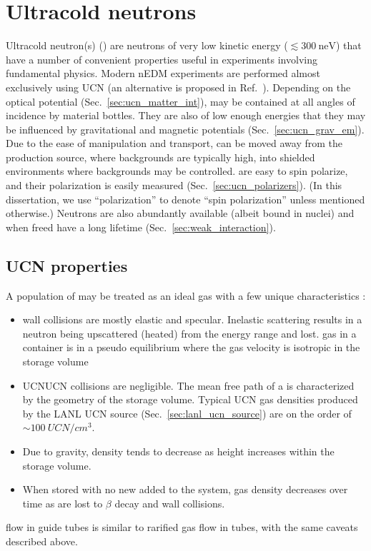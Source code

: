 
\chapter{Ultracold neutrons}\label{chap:UCN}


Ultracold neutron(s) (\ucn) are neutrons of very low kinetic energy ($\lesssim \qty{300}{\nano\eV}$) that have a number of convenient properties useful in experiments involving fundamental physics. Modern nEDM experiments are performed almost exclusively using UCN \cite{BAK06, SER15, ABE20} (an alternative is proposed in Ref.~\cite{PIE13}). Depending on the optical potential (Sec.~\ref{sec:ucn_matter_int}), \ucn may be contained at all angles of incidence by material bottles. They are also of low enough energies that they may be influenced by gravitational and magnetic potentials (Sec.~\ref{sec:ucn_grav_em}). Due to the ease of manipulation and transport, \ucn can be moved away from the production source, where backgrounds are typically high, into shielded environments where backgrounds may be controlled. \ucn are easy to spin polarize, and their polarization is easily measured (Sec.~\ref{sec:ucn_polarizers}). (In this dissertation, we use ``polarization'' to denote ``spin polarization'' unless mentioned otherwise.) Neutrons are also abundantly available (albeit bound in nuclei) and when freed have a long lifetime (Sec.~\ref{sec:weak_interaction}).


\section{UCN properties}


A population of \ucn may be treated as an ideal gas with a few unique characteristics \cite{golubUCN}: 
%
\begin{itemize}
    \item \ucn wall collisions are mostly elastic and specular. Inelastic scattering results in a neutron being upscattered (heated) from the \ucn energy range and lost. \ucn gas in a container is in a pseudo equilibrium where the gas velocity is isotropic in the storage volume
    \item UCN\textendash UCN collisions are negligible. The mean free path of a \ucn is characterized by the geometry of the storage volume. Typical UCN gas densities produced by the LANL UCN source (Sec.~\ref{sec:lanl_ucn_source}) are on the order of $\sim\qty{100}{UCN \per cm^3}$.
    \item Due to gravity, \ucn density tends to decrease as height increases within the storage volume.
    \item When stored with no new \ucn added to the system, \ucn gas density decreases over time as \ucn are lost to $\beta$ decay and wall collisions.
\end{itemize}
%
\ucn flow in guide tubes is similar to rarified gas flow in tubes, with the same caveats described above.


